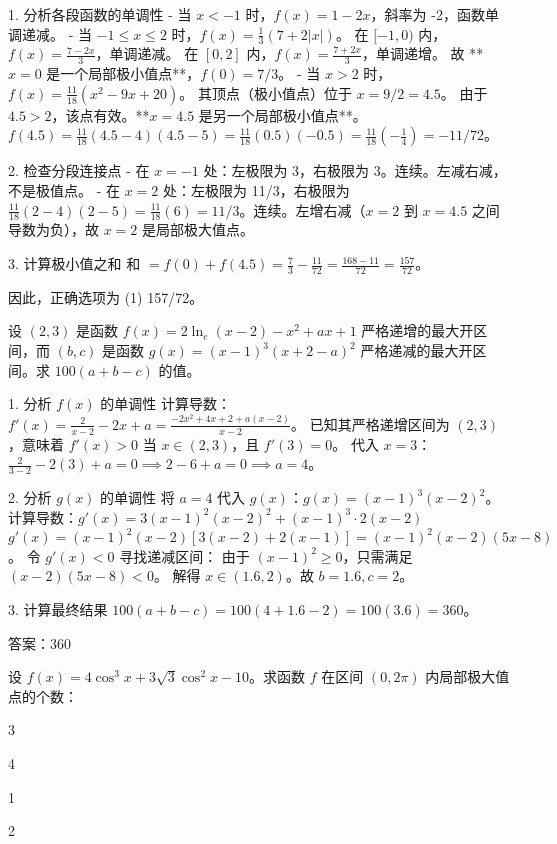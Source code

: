 \begin{questions}
\begin{solution}
1. 分析各段函数的单调性
- 当 $x < -1$ 时，$f(x) = 1 - 2x$，斜率为 -2，函数单调递减。
- 当 $-1 \leq x \leq 2$ 时，$f(x) = \frac{1}{3}(7 + 2|x|)$。
  在 $[-1, 0)$ 内，$f(x) = \frac{7-2x}{3}$，单调递减。
  在 $[0, 2]$ 内，$f(x) = \frac{7+2x}{3}$，单调递增。
  故 **$x = 0$ 是一个局部极小值点**，$f(0) = 7/3$。
- 当 $x > 2$ 时，$f(x) = \frac{11}{18}(x^2 - 9x + 20)$。
  其顶点（极小值点）位于 $x = 9/2 = 4.5$。
  由于 $4.5 > 2$，该点有效。**$x = 4.5$ 是另一个局部极小值点**。
  $f(4.5) = \frac{11}{18}(4.5 - 4)(4.5 - 5) = \frac{11}{18}(0.5)(-0.5) = \frac{11}{18}(-\frac{1}{4}) = -11/72$。

2. 检查分段连接点
- 在 $x = -1$ 处：左极限为 3，右极限为 3。连续。左减右减，不是极值点。
- 在 $x = 2$ 处：左极限为 11/3，右极限为 $\frac{11}{18}(2-4)(2-5) = \frac{11}{18}(6) = 11/3$。连续。左增右减（$x=2$ 到 $x=4.5$ 之间导数为负），故 $x=2$ 是局部极大值点。

3. 计算极小值之和
和 $= f(0) + f(4.5) = \frac{7}{3} - \frac{11}{72} = \frac{168 - 11}{72} = \frac{157}{72}$。

因此，正确选项为 (1) 157/72。
\end{solution}

\question 
设 $(2, 3)$ 是函数 $f(x) = 2\ln_e(x - 2) - x^2 + ax + 1$ 严格递增的最大开区间，而 $(b, c)$ 是函数 $g(x) = (x - 1)^3(x + 2 - a)^2$ 严格递减的最大开区间。求 $100(a + b - c)$ 的值。

\begin{solution}
1. 分析 $f(x)$ 的单调性
计算导数：$f'(x) = \frac{2}{x-2} - 2x + a = \frac{-2x^2 + 4x + 2 + a(x-2)}{x-2}$。
已知其严格递增区间为 $(2, 3)$，意味着 $f'(x) > 0$ 当 $x \in (2, 3)$，且 $f'(3) = 0$。
代入 $x=3$：$\frac{2}{3-2} - 2(3) + a = 0 \implies 2 - 6 + a = 0 \implies a = 4$。

2. 分析 $g(x)$ 的单调性
将 $a=4$ 代入 $g(x)$：$g(x) = (x - 1)^3(x - 2)^2$。
计算导数：$g'(x) = 3(x-1)^2(x-2)^2 + (x-1)^3 \cdot 2(x-2)$
$g'(x) = (x-1)^2(x-2) [3(x-2) + 2(x-1)] = (x-1)^2(x-2)(5x - 8)$。
令 $g'(x) < 0$ 寻找递减区间：
由于 $(x-1)^2 \geq 0$，只需满足 $(x-2)(5x-8) < 0$。
解得 $x \in (1.6, 2)$。故 $b = 1.6, c = 2$。

3. 计算最终结果
$100(a + b - c) = 100(4 + 1.6 - 2) = 100(3.6) = 360$。

答案：360
\end{solution}

\question 
设 $f(x) = 4\cos^3 x + 3\sqrt{3}\cos^2 x - 10$。求函数 $f$ 在区间 $(0, 2\pi)$ 内局部极大值点的个数：
\begin{choices}
    \item 3
    \item 4
    \item 1
    \item 2
\end{choices}


\end{questions}
